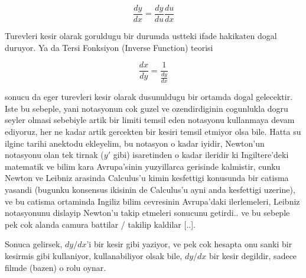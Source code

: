 \documentclass[12pt,fleqn]{article}\usepackage{../common}
\begin{document}
\[ \frac{dy}{dx} = \frac{dy}{du}\frac{du}{dx} \]

Turevleri kesir olarak goruldugu bir durumda ustteki ifade hakikaten dogal
duruyor. Ya da Tersi Fonksiyon (Inverse Function) teorisi

\[ \frac{dx}{dy} = \frac{1}{\frac{dy}{dx}} \]

sonucu da eger turevleri kesir olarak dusunuldugu bir ortamda dogal
gelecektir. Iste bu sebeple, yani notasyonun cok guzel ve ozendirdiginin
cogunlukla dogru seyler olmasi sebebiyle artik bir limiti temsil eden
notasyonu kullanmaya devam ediyoruz, her ne kadar artik gercekten bir
kesiri temsil etmiyor olsa bile. Hatta su ilginc tarihi anektodu ekleyelim,
bu notasyon o kadar iyidir, Newton'un notasyonu olan tek tirnak ($y'$ gibi)
isaretinden o kadar ileridir ki Ingiltere'deki matematik ve bilim kara
Avrupa'sinin yuzyillarca gerisinde kalmistir, cunku Newton ve Leibniz
arasinda Calculus'u kimin kesfettigi konusunda bir catisma yasandi (bugunku
konsensus ikisinin de Calculus'u ayni anda kesfettigi uzerine), ve bu
catisma ortaminda Ingiliz bilim cevresinin Avrupa'daki ilerlemeleri,
Leibniz notasyonunu dislayip Newton'u takip etmeleri sonucunu getirdi.. ve
bu sebeple pek cok alanda camura battilar / takilip kaldilar [..].

Sonuca gelirsek, $dy/dx$'i bir kesir gibi yaziyor, ve pek cok hesapta onu
sanki bir kesirmis gibi kullaniyor, kullanabiliyor olsak bile, $dy/dx$ bir
kesir degildir, sadece filmde (bazen) o rolu oynar. 
\end{document}
